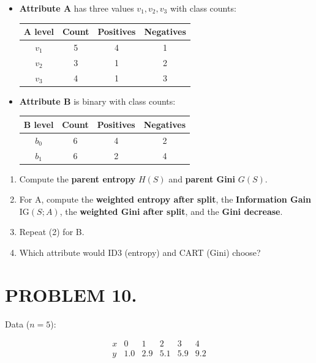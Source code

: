 \documentclass[12pt]{article}
\begin{document}
\begin{itemize}
\item \textbf{Attribute A} has three values \(v_{1},v_{2},v_{3}\) with class counts:

\begin{center}
\begin{tabular}{|c|c|c|c|}
\hline
A level & Count & Positives & Negatives \\
\hline
\(v_{1}\) & 5 & 4 & 1 \\
\(v_{2}\) & 3 & 1 & 2 \\
\(v_{3}\) & 4 & 1 & 3 \\
\hline
\end{tabular}
\end{center}

\item \textbf{Attribute B} is binary with class counts:

\begin{center}
\begin{tabular}{|c|c|c|c|}
\hline
B level & Count & Positives & Negatives \\
\hline
\(b_{0}\) & 6 & 4 & 2 \\
\(b_{1}\) & 6 & 2 & 4 \\
\hline
\end{tabular}
\end{center}
\end{itemize}

\begin{enumerate}
\item Compute the \textbf{parent entropy} \(H(S)\) and \textbf{parent Gini} \(G(S)\).
\item For A, compute the \textbf{weighted entropy after split}, the \textbf{Information Gain} \(\text{IG}(S;A)\), the \textbf{weighted Gini after split}, and the \textbf{Gini decrease}.
\item Repeat (2) for B.
\item Which attribute would ID3 (entropy) and CART (Gini) choose?
\end{enumerate}

\section*{PROBLEM 10.}

Data (\(n=5\)):

\[\begin{array}{c|c|c|c|c|c}
x & 0 & 1 & 2 & 3 & 4 \\
\hline
y & 1.0 & 2.9 & 5.1 & 5.9 & 9.2 \\
\end{array}\]
\end{document}
